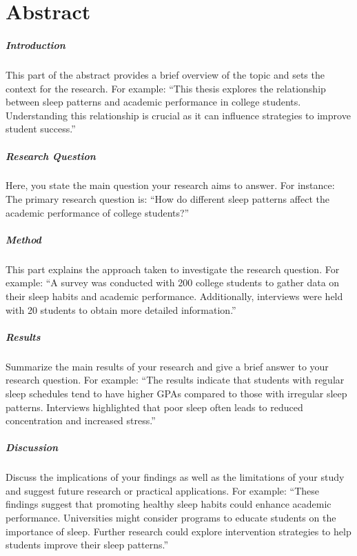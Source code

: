 \chapter*{Abstract} 
\pagestyle{plain}

\paragraph{Introduction} This part of the abstract provides a brief overview of the topic and sets the context for the research. For example: ``This thesis explores the relationship between sleep patterns and academic performance in college students. Understanding this relationship is crucial as it can influence strategies to improve student success.'' 

\paragraph{Research Question} Here, you state the main question your research aims to answer. For instance: The primary research question is: ``How do different sleep patterns affect the academic performance of college students?''

\paragraph{Method} This part explains the approach taken to investigate the research question. For example: ``A survey was conducted with 200 college students to gather data on their sleep habits and academic performance. Additionally, interviews were held with 20 students to obtain more detailed information.''

\paragraph{Results} Summarize the main results of your research and give a brief answer to your research question. For example: ``The results indicate that students with regular sleep schedules tend to have higher GPAs compared to those with irregular sleep patterns. Interviews highlighted that poor sleep often leads to reduced concentration and increased stress.''

\paragraph{Discussion} Discuss the implications of your findings as well as the limitations of your study and suggest future research or practical applications. For example: ``These findings suggest that promoting healthy sleep habits could enhance academic performance. Universities might consider programs to educate students on the importance of sleep. Further research could explore intervention strategies to help students improve their sleep patterns.''